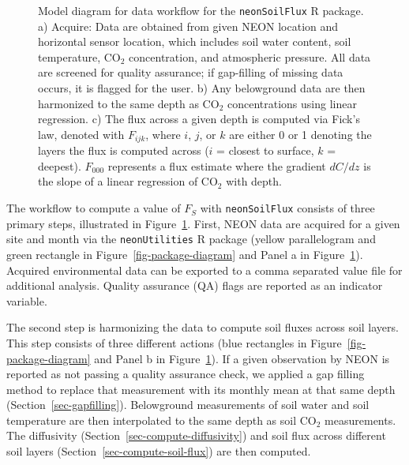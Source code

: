 \documentclass[
  letterpaper,
  DIV=11,
  numbers=noendperiod]{scrartcl}
\begin{document}
\begin{figure}


\caption{\label{fig-model-diagram}Model diagram for data workflow for
the \texttt{neonSoilFlux} R package. a) Acquire: Data are obtained from
given NEON location and horizontal sensor location, which includes soil
water content, soil temperature, CO\(_{2}\) concentration, and
atmospheric pressure. All data are screened for quality assurance; if
gap-filling of missing data occurs, it is flagged for the user. b) Any
belowground data are then harmonized to the same depth as CO\(_{2}\)
concentrations using linear regression. c) The flux across a given depth
is computed via Fick's law, denoted with \(F_{ijk}\), where \(i\),
\(j\), or \(k\) are either 0 or 1 denoting the layers the flux is
computed across (\(i\) = closest to surface, \(k\) = deepest).
\(F_{000}\) represents a flux estimate where the gradient \(dC/dz\) is
the slope of a linear regression of CO\(_{2}\) with depth.}

\end{figure}%

The workflow to compute a value of \(F_{S}\) with \texttt{neonSoilFlux}
consists of three primary steps, illustrated in
Figure~\ref{fig-model-diagram}. First, NEON data are acquired for a
given site and month via the \texttt{neonUtilities} R package (yellow
parallelogram and green rectangle in Figure~\ref{fig-package-diagram}
and Panel a in Figure~\ref{fig-model-diagram}). Acquired environmental
data can be exported to a comma separated value file for additional
analysis. Quality assurance (QA) flags are reported as an indicator
variable.

The second step is harmonizing the data to compute soil fluxes across
soil layers. This step consists of three different actions (blue
rectangles in Figure~\ref{fig-package-diagram} and Panel b in
Figure~\ref{fig-model-diagram}). If a given observation by NEON is
reported as not passing a quality assurance check, we applied a gap
filling method to replace that measurement with its monthly mean at that
same depth (Section~\ref{sec-gapfilling}). Belowground measurements of
soil water and soil temperature are then interpolated to the same depth
as soil CO\(_{2}\) measurements. The diffusivity
(Section~\ref{sec-compute-diffusivity}) and soil flux across different
soil layers (Section~\ref{sec-compute-soil-flux}) are then computed.
\end{document}
